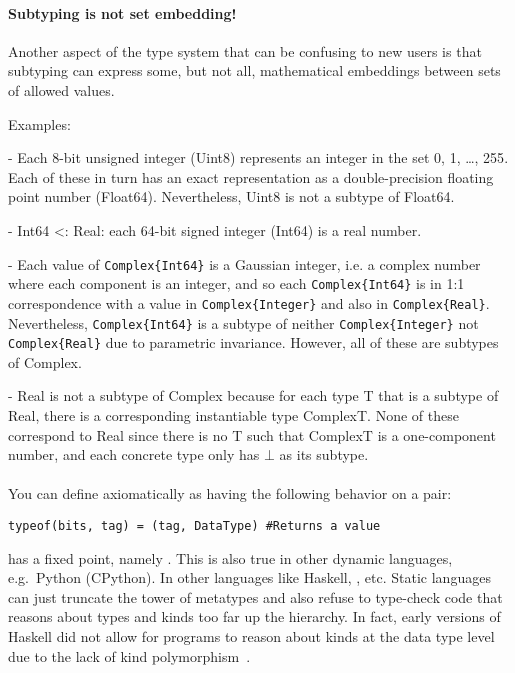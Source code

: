 \documentclass[pldi]{sigplanconf-pldi15}
\begin{document}
\paragraph{Subtyping is not set embedding!}
Another aspect of the type system that can be confusing to new users is that
subtyping can express some, but not all, mathematical embeddings between sets
of allowed values.

Examples:

- Each 8-bit unsigned integer (Uint8) represents an integer in the set {0, 1,
\dots, 255}. Each of these in turn has an exact representation as a
double-precision floating point number (Float64). Nevertheless, Uint8 is not a
subtype of Float64.

- Int64 <: Real: each 64-bit signed integer (Int64) is a real number.

- Each value of \verb|Complex{Int64}| is a Gaussian integer, i.e. a complex number
where each component is an integer, and so each \verb|Complex{Int64}| is in 1:1
correspondence with a value in \verb|Complex{Integer}| and also in \verb|Complex{Real}|.
Nevertheless, \verb|Complex{Int64}| is a subtype of neither \verb|Complex{Integer}| not
\verb|Complex{Real}| due to parametric invariance. However, all of these are subtypes
of Complex.

- Real is not a subtype of Complex because for each type T that is a subtype of
Real, there is a corresponding instantiable type Complex{T}. None of these
correspond to Real since there is no T such that Complex{T} is a one-component
number, and each concrete type only has $\bot$ as its subtype.  


\paragraph{}

You can define  axiomatically as having the following behavior on a  pair:

\begin{verbatim}
typeof(bits, tag) = (tag, DataType) #Returns a value
\end{verbatim}

 has a fixed point, namely . This is
also true in other dynamic languages, e.g.\ Python (CPython). In other
languages like Haskell, , etc. Static languages
can just truncate the tower of metatypes and also refuse to type-check code
that reasons about types and kinds too far up the hierarchy. In fact, early
versions of Haskell did not allow for programs to reason about kinds at the
data type level due to the lack of kind polymorphism~\cite{haskellkindtypes}.
\end{document}
